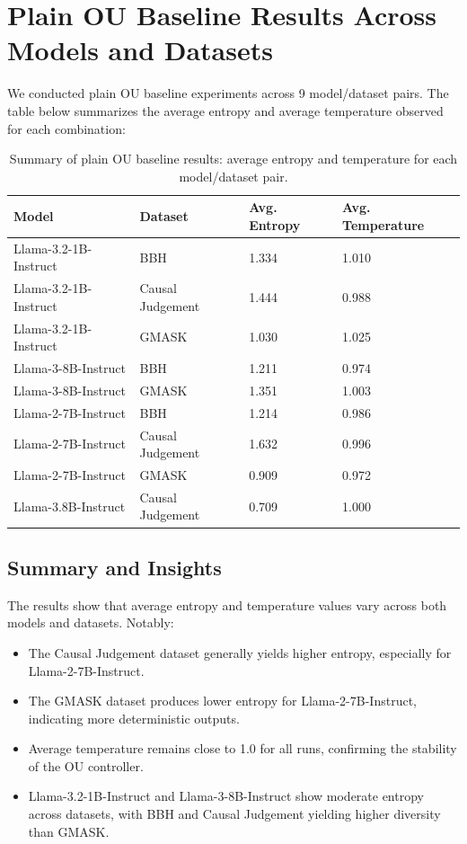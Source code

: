 \section{Plain OU Baseline Results Across Models and Datasets}

We conducted plain OU baseline experiments across 9 model/dataset pairs. The table below summarizes the average entropy and average temperature observed for each combination:

\begin{table}[h]
    \centering
    \begin{tabular}{l l l l}
        \toprule
        Model & Dataset & Avg. Entropy & Avg. Temperature \\
        \midrule
        Llama-3.2-1B-Instruct & BBH & 1.334 & 1.010 \\
        Llama-3.2-1B-Instruct & Causal Judgement & 1.444 & 0.988 \\
        Llama-3.2-1B-Instruct & GMASK & 1.030 & 1.025 \\
        Llama-3-8B-Instruct & BBH & 1.211 & 0.974 \\
        Llama-3-8B-Instruct & GMASK & 1.351 & 1.003 \\
        Llama-2-7B-Instruct & BBH & 1.214 & 0.986 \\
        Llama-2-7B-Instruct & Causal Judgement & 1.632 & 0.996 \\
        Llama-2-7B-Instruct & GMASK & 0.909 & 0.972 \\
        Llama-3.8B-Instruct & Causal Judgement & 0.709 & 1.000 \\
        \bottomrule
    \end{tabular}
    \caption{Summary of plain OU baseline results: average entropy and temperature for each model/dataset pair.}
\end{table}

\subsection{Summary and Insights}

The results show that average entropy and temperature values vary across both models and datasets. Notably:
\begin{itemize}
    \item The Causal Judgement dataset generally yields higher entropy, especially for Llama-2-7B-Instruct.
    \item The GMASK dataset produces lower entropy for Llama-2-7B-Instruct, indicating more deterministic outputs.
    \item Average temperature remains close to 1.0 for all runs, confirming the stability of the OU controller.
    \item Llama-3.2-1B-Instruct and Llama-3-8B-Instruct show moderate entropy across datasets, with BBH and Causal Judgement yielding higher diversity than GMASK.
\end{itemize}

